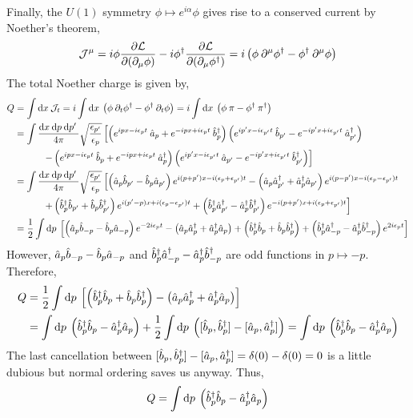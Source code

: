 \documentclass[12pt]{extarticle}
\begin{document}
Finally, the $U(1)$ symmetry $\phi \mapsto e^{i \alpha} \phi$ gives rise to a conserved current by Noether's theorem,
\[ \mathcal{J}^\mu =  i \phi \frac{\partial{\mathcal{L}}}{\partial{(\partial_\mu \phi)}} - i \phi^\dagger \frac{\partial{\mathcal{L}}}{\partial{(\partial_\mu \phi^\dagger)}} = i\left(  \phi \: \partial^\mu \phi^\dagger - \phi^\dagger \: \partial^\mu \phi \right)\]
The total Noether charge is given by,
\begin{align*}
Q & = \int \mathrm{d}x \: \mathcal{J}_t = i \int \mathrm{d}x \: \left(  \phi \: \partial_t \phi^\dagger - \phi^\dagger \: \partial_t \phi \right) = i \int \mathrm{d}x \: \left(  \phi \: \pi - \phi^\dagger \: \pi^\dagger \right)
\\
& = \int \frac{\mathrm{d}x \: \mathrm{d}p \: \mathrm{d}p' \:}{4 \pi} \sqrt{\frac{\epsilon_{p'}}{\epsilon_p}} \left[
\left( e^{i p x - i \epsilon_p t} \: \hat{a}_p + e^{- i p x + i \epsilon_p t} \: \hat{b}^\dagger_p \right)  \left( e^{i p' x - i \epsilon_{p'} t} \: \hat{b}_{p'} - e^{- i p' x + i \epsilon_{p'} t} \: \hat{a}^\dagger_{p'} \right)
\right.
\\
& \left. \quad \quad \quad - \left( e^{i p x - i \epsilon_p t} \: \hat{b}_p + e^{- i p x + i \epsilon_p t} \: \hat{a}^\dagger_p \right)  \left( e^{i p' x - i \epsilon_{p'} t} \: \hat{a}_{p'} - e^{- i p' x + i \epsilon_{p'} t} \: \hat{b}^\dagger_{p'} \right)  \right]
\\
& = \int \frac{\mathrm{d}x \: \mathrm{d}p \: \mathrm{d}p' \:}{4 \pi} \sqrt{\frac{\epsilon_{p'}}{\epsilon_p}} \left[ \left( \hat{a}_p \hat{b}_{p'} - \hat{b}_p \hat{a}_{p'} \right) e^{i (p + p') x - i (\epsilon_p + \epsilon_{p'})t} - \left( \hat{a}_p \hat{a}^\dagger_{p'} + \hat{a}^\dagger_p \hat{a}_{p'} \right) e^{i (p - p') x - i (\epsilon_p - \epsilon_{p'})t}  \right.
\\
& \left. \quad \quad \quad + \left( \hat{b}^\dagger_p \hat{b}_{p'} + \hat{b}_p \hat{b}^\dagger_{p'} \right) e^{i (p' - p) x + i (\epsilon_p - \epsilon_{p'})t} + \left( \hat{b}^\dagger_p \hat{a}^\dagger_{p'} - \hat{a}^\dagger_p \hat{b}^\dagger_{p'} \right) e^{-i (p + p') x + i (\epsilon_p + \epsilon_{p'})t} \right]
\\
& = \frac{1}{2} \int \mathrm{d}p \:  \left[ \left( \hat{a}_p \hat{b}_{-p} - \hat{b}_p \hat{a}_{-p} \right) e^{- 2 i \epsilon_p t} - \left( \hat{a}_p \hat{a}^\dagger_{p} + \hat{a}^\dagger_p \hat{a}_{p} \right) + \left( \hat{b}^\dagger_p \hat{b}_{p} + \hat{b}_p \hat{b}^\dagger_{p} \right) + \left( \hat{b}^\dagger_p \hat{a}^\dagger_{-p} - \hat{a}^\dagger_p \hat{b}^\dagger_{-p} \right) e^{2 i \epsilon_p  t} \right]
\end{align*}
However, $\hat{a}_p \hat{b}_{-p} - \hat{b}_p \hat{a}_{-p}$ and $\hat{b}^\dagger_p \hat{a}^\dagger_{-p} - \hat{a}^\dagger_p \hat{b}^\dagger_{-p}$ are odd functions in $p \mapsto -p$. Therefore,
\begin{align*}
Q & = \frac{1}{2} \int \mathrm{d}p \:  \left[ \left( \hat{b}^\dagger_p \hat{b}_{p} + \hat{b}_p \hat{b}^\dagger_{p} \right) - \left( \hat{a}_p \hat{a}^\dagger_{p} + \hat{a}^\dagger_p \hat{a}_{p} \right) \right]
\\
& = \int \mathrm{d}p \: \left( \hat{b}^\dagger_p \hat{b}_{p} - \hat{a}^\dagger_p \hat{a}_{p} \right) + \frac{1}{2} \int \mathrm{d}p \: \left( [\hat{b}_p, \hat{b}^\dagger_{p}]  - [\hat{a}_p, \hat{a}^\dagger_{p}] \right) =  \int \mathrm{d}p \: \left( \hat{b}^\dagger_p \hat{b}_{p} - \hat{a}^\dagger_p \hat{a}_{p} \right)
\end{align*}
The last cancellation between $[\hat{b}_p, \hat{b}^\dagger_{p}]  - [\hat{a}_p, \hat{a}^\dagger_{p}] = \delta(0) - \delta(0) = 0$ is a little dubious but normal ordering saves us anyway. Thus,
\[ Q =  \int \mathrm{d}p \: \left( \hat{b}^\dagger_p \hat{b}_{p} - \hat{a}^\dagger_p \hat{a}_{p} \right)\]
\end{document}
